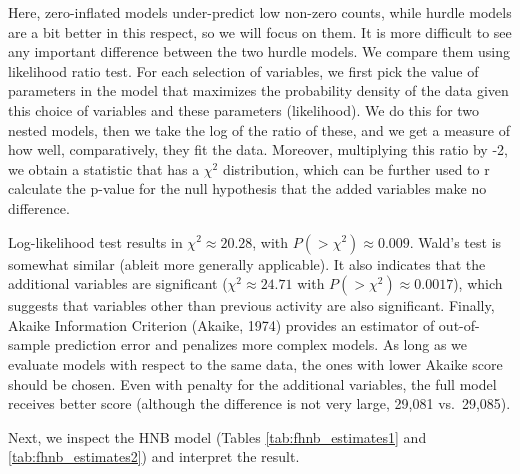 \documentclass[10pt,]{scrartcl}
\begin{document}
Here, zero-inflated models under-predict low non-zero counts, while
hurdle models are a bit better in this respect, so we will focus on
them. It is more difficult to see any important difference between the
two hurdle models. We compare them using likelihood ratio test. For each
selection of variables, we first pick the value of parameters in the
model that maximizes the probability density of the data given this
choice of variables and these parameters (likelihood). We do this for
two nested models, then we take the log of the ratio of these, and we
get a measure of how well, comparatively, they fit the data. Moreover,
multiplying this ratio by -2, we obtain a statistic that has a
\(\chi^2\) distribution, which can be further used to r calculate the
p-value for the null hypothesis that the added variables make no
difference.

Log-likelihood test results in \(\chi^2 \approx 20.28\), with
\(P(>\chi^2)\approx 0.009\). Wald's test is somewhat similar (ableit
more generally applicable). It also indicates that the additional
variables are significant (\(\chi^2 \approx 24.71\) with
\(P(>\chi^2)\approx 0.0017\)), which suggests that variables other than
previous activity are also significant. Finally, Akaike Information
Criterion (Akaike, 1974) provides an estimator of out-of-sample
prediction error and penalizes more complex models. As long as we
evaluate models with respect to the same data, the ones with lower
Akaike score should be chosen. Even with penalty for the additional
variables, the full model receives better score (although the difference
is not very large, 29,081 vs.~29,085).

Next, we inspect the HNB model (Tables \ref{tab:fhnb_estimates1} and
\ref{tab:fhnb_estimates2}) and interpret the result.

\footnotesize
\end{document}
